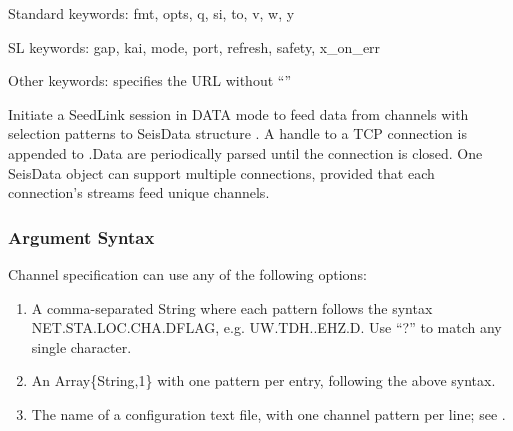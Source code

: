 \documentclass[letterpaper,11pt,english]{sphinxmanual}
\begin{document}
\begin{fulllineitems}
\end{fulllineitems}



\begin{fulllineitems}
\end{fulllineitems}


\begin{DUlineblock}{0em}
\item[] Standard keywords: fmt, opts, q, si, to, v, w, y
\item[] SL keywords: gap, kai, mode, port, refresh, safety, x\_on\_err
\item[] Other keywords:  specifies the URL without “”
\end{DUlineblock}

Initiate a SeedLink session in DATA mode to feed data from channels  with
selection patterns  to SeisData structure . A handle to a TCP
connection is appended to .Data are periodically parsed until the
connection is closed. One SeisData object can support multiple connections,
provided that each connection’s streams feed unique channels.


\subsubsection{Argument Syntax}
\label{\detokenize{src/Web/seedlink:argument-syntax}}

Channel specification can use any of the following options:
\begin{enumerate}
\def\theenumi{\arabic{enumi}}
\def\labelenumi{\theenumi .}
\makeatletter\def\p@enumii{\p@enumi \theenumi .}\makeatother
\item {} 
A comma-separated String where each pattern follows the syntax NET.STA.LOC.CHA.DFLAG, e.g. UW.TDH..EHZ.D. Use “?” to match any single character.

\item {} 
An Array\{String,1\} with one pattern per entry, following the above syntax.

\item {} 
The name of a configuration text file, with one channel pattern per line; see {\hyperref[\detokenize{src/Appendices/web_syntax:ccfg}]{}}.

\end{enumerate}
\end{document}
